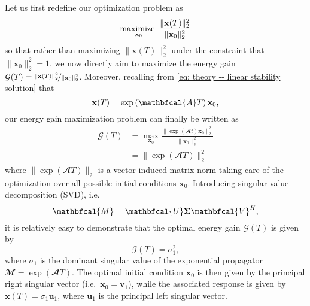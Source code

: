       Let us first redefine our optimization problem as
      \begin{equation}
        \maximize_{\mathbf{x}_0} \displaystyle \frac{\| \mathbf{x}(T) \|_2^2}{\| \mathbf{x}_0 \|_2^2}
        \label{eq: theory -- energy gain}
      \end{equation}
      so that rather than maximizing $\| \mathbf{x}(T) \|_2^2$ under the constraint that $\| \mathbf{x}_0 \|_2^2 = 1$, we now directly aim to maximize the energy gain $\mathcal{G}(T) = \nicefrac{\| \mathbf{x}(T) \|_2^2}{\| \mathbf{x}_0 \|_2^2}$. Moreover, recalling from \eqref{eq: theory -- linear stability solution} that
      \begin{equation}
        \mathbf{x}(T) = \exp \left( \mathbfcal{A} T \right) \mathbf{x}_0,
        \notag
      \end{equation}
      our energy gain maximization problem can finally be written as
      \begin{equation}
        \begin{aligned}
          \mathcal{G}(T) & = \max_{\mathbf{x}_0} \displaystyle \frac{\| \exp \left( \mathbfcal{A} t \right) \mathbf{x}_0 \|_2^2}{\| \mathbf{x}_0 \|_2^2} \\
          & = \| \exp \left( \mathbfcal{A} T \right) \|_2^2
        \end{aligned}
      \end{equation}
      where $\| \exp \left( \mathbfcal{A} T \right) \|_2$ is a vector-induced matrix norm taking care of the optimization over all possible initial conditions $\mathbf{x}_0$. Introducing singular value decomposition (SVD), i.e.\
      \begin{equation}
        \mathbfcal{M} = \mathbfcal{U} \boldsymbol{\Sigma} \mathbfcal{V}^H,
        \notag
      \end{equation}
      it is relatively easy to demonstrate that the optimal energy gain $\mathcal{G}(T)$ is given by
      \begin{equation}
        \mathcal{G}(T) = \sigma_1^2,
        \label{theory -- optimal energy gain }
      \end{equation}
      where $\sigma_1$ is the dominant singular value of the exponential propagator $\mathbfcal{M} = \exp \left( \mathbfcal{A} T \right)$. The optimal initial condition $\mathbf{x}_0$ is then given by the principal right singular vector (i.e.\ $\mathbf{x}_0 = \mathbf{v}_1$), while the associated response is given by $\mathbf{x}(T) = \sigma_1 \mathbf{u}_1$, where $\mathbf{u}_1$ is the principal left singular vector.

